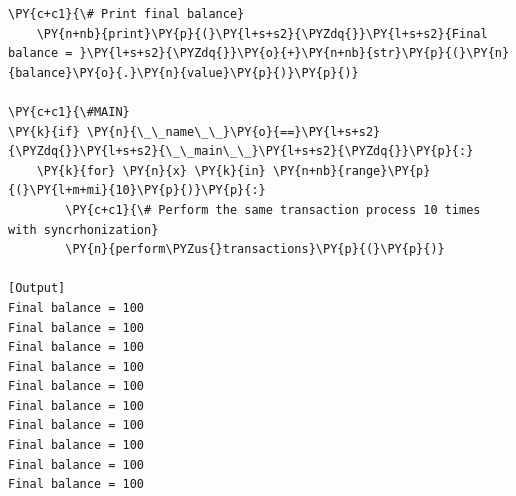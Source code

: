 \begin{Verbatim}[label=\makebox{\url{https://github.com/lucabaldini/cmepda/tree/master/slides/latex/snippets/synchro2.py}},commandchars=\\\{\}]
    \PY{c+c1}{\# Print final balance}
    \PY{n+nb}{print}\PY{p}{(}\PY{l+s+s2}{\PYZdq{}}\PY{l+s+s2}{Final balance = }\PY{l+s+s2}{\PYZdq{}}\PY{o}{+}\PY{n+nb}{str}\PY{p}{(}\PY{n}{balance}\PY{o}{.}\PY{n}{value}\PY{p}{)}\PY{p}{)}

\PY{c+c1}{\#MAIN}
\PY{k}{if} \PY{n}{\_\_name\_\_}\PY{o}{==}\PY{l+s+s2}{\PYZdq{}}\PY{l+s+s2}{\_\_main\_\_}\PY{l+s+s2}{\PYZdq{}}\PY{p}{:}
    \PY{k}{for} \PY{n}{x} \PY{k}{in} \PY{n+nb}{range}\PY{p}{(}\PY{l+m+mi}{10}\PY{p}{)}\PY{p}{:}
        \PY{c+c1}{\# Perform the same transaction process 10 times with syncrhonization}
        \PY{n}{perform\PYZus{}transactions}\PY{p}{(}\PY{p}{)}

[Output]
Final balance = 100
Final balance = 100
Final balance = 100
Final balance = 100
Final balance = 100
Final balance = 100
Final balance = 100
Final balance = 100
Final balance = 100
Final balance = 100
\end{Verbatim}